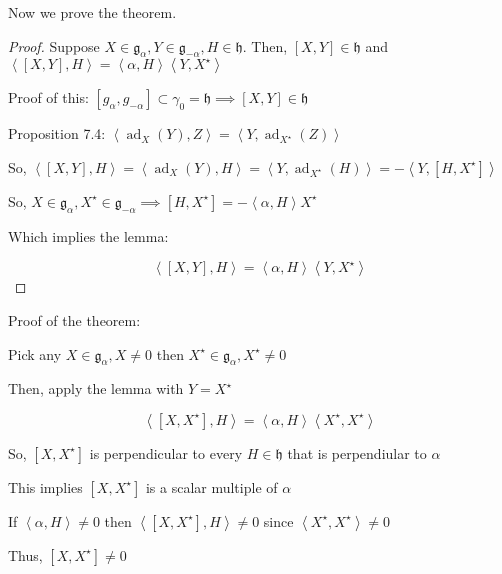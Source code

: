 \documentclass{article}
\theoremstyle{definition}
\begin{document}
Now we prove the theorem.

\begin{proof}

    Suppose \(X\in \mathfrak{g}_\alpha , Y\in \mathfrak{g} _{-\alpha }, H\in \mathfrak{h}  \). Then, \([X,Y]\in \mathfrak{h} \) and \(\left\langle [X,Y],H \right\rangle = \left\langle \alpha ,H \right\rangle \left\langle Y,X^{\star}  \right\rangle \) 
        
    Proof of this: \([g_\alpha ,g_{-\alpha }] \subset \gamma _0=\mathfrak{h} \implies [X,Y]\in \mathfrak{h}  \) 

    
    Proposition 7.4: \(\left\langle \operatorname{ad}_X(Y),Z  \right\rangle = \left\langle Y,\operatorname{ad}_{X^{\star}  }(Z)  \right\rangle  \) 

    So, \(\left\langle [X,Y],H \right\rangle = \left\langle \operatorname{ad}_X(Y), H  \right\rangle = \left\langle Y,\operatorname{ad}_{X^{\star} }(H)  \right\rangle = - \left\langle Y,[H,X^{\star} ] \right\rangle   \) 

    So, \(X\in \mathfrak{g}_\alpha ,X^{\star} \in \mathfrak{g}_{-\alpha }\implies [H,X^{\star} ]=-\left\langle \alpha ,H \right\rangle X^{\star}  \) 

    Which implies the lemma:

    \[
        \left\langle [X,Y],H \right\rangle = \left\langle \alpha ,H \right\rangle \left\langle Y, X^{\star}  \right\rangle  
    \]


\end{proof}


Proof of the theorem:

Pick any \(X\in \mathfrak{g}_\alpha, X\neq 0 \) then \(X^{\star} \in \mathfrak{g}_\alpha ,X^{\star} \neq 0 \) 

Then, apply the lemma with \(Y=X^{\star} \) 

\[
    \left\langle [X,X^{\star} ],H \right\rangle    = \left\langle \alpha ,H \right\rangle \left\langle X^{\star} ,X^{\star}  \right\rangle  
\]

So, \([X,X^{\star} ]\) is perpendicular to every \(H\in \mathfrak{h} \) that is perpendiular to \(\alpha \)

This implies \([X,X^{\star} ]\) is a scalar multiple of \(\alpha \) 

If \(\left\langle \alpha ,H \right\rangle \neq 0\) then \(\left\langle [X,X^{\star} ],H \right\rangle \neq 0\) since \(\left\langle X^{\star} ,X^{\star}  \right\rangle \neq 0\) 

Thus, \([X,X^{\star} ]\neq 0\) 
\end{document}
